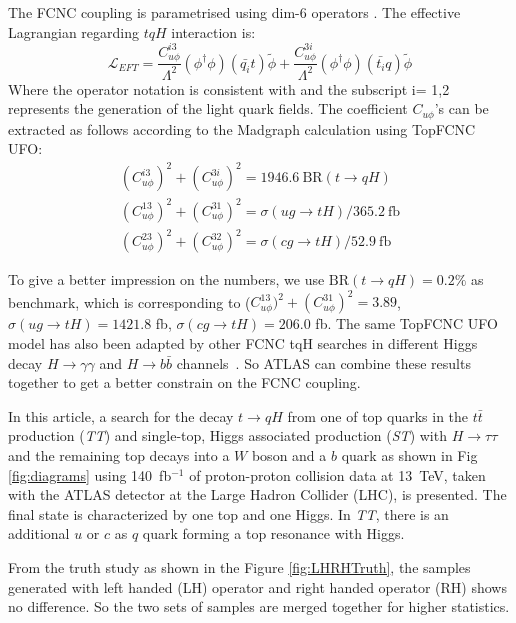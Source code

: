 The FCNC coupling is parametrised using dim-6 operators \cite{fcnc_production_theory}. The effective Lagrangian regarding $tqH$ interaction is:
%
\begin{equation}
\mathcal{L}_{EFT} = \frac{C^{i3}_{u\phi}}{\Lambda^{2}}(\phi^{\dagger}\phi)(\bar{q_{i}}t)\tilde{\phi} + \frac{C^{3i}_{u\phi}}{\Lambda^{2}}(\phi^{\dagger}\phi)(\bar{t_{i}}q)\tilde{\phi}
\label{eq:eq01}
\end{equation}
%
Where the operator notation is consistent with \cite{fcnc_production_theory} and the subscript i= 1,2 represents the generation of the light quark fields. 
The coefficient $C_{u\phi}$'s can be extracted as follows according to the Madgraph calculation using TopFCNC UFO:
\begin{equation}
\begin{array}{l}
(C^{i3}_{u\phi})^2 + (C^{3i}_{u\phi})^2 = 1946.6~\text{BR}(t\to qH)\\
(C^{13}_{u\phi})^2 + (C^{31}_{u\phi})^2 = \sigma(ug\to tH)/365.2~\text{fb}\\
(C^{23}_{u\phi})^2 + (C^{32}_{u\phi})^2 = \sigma(cg\to tH)/52.9~\text{fb}
\end{array}
\label{eq:eq02}
\end{equation}

To give a better impression on the numbers, we use $\text{BR}(t\to qH)=0.2\%$ as benchmark, which is corresponding to ($C^{13}_{u\phi})^2 + (C^{31}_{u\phi})^2=3.89$, $\sigma(ug\to tH)=1421.8$ fb, $\sigma(cg\to tH)=206.0$ fb. The same TopFCNC UFO model has also been adapted by other FCNC tqH searches in different Higgs decay $H\rightarrow\gamma\gamma$ and $H\rightarrow b\bar b$
channels~\cite{tqHgammagamma,tqHbb}. So ATLAS can combine these results together to get a better constrain on the FCNC coupling.  

In this article, a search for the decay $t\to qH$ from one of top quarks in the $t\bar{t}$ production (\textit{TT}) and single-top, Higgs associated production (\textit{ST}) with $H\to\tau\tau$ and the remaining top decays into a $W$ boson and a $b$ quark as shown in Fig \ref{fig:diagrams} using 140~fb$^{-1}$ of proton-proton collision data at 13~TeV, taken with the ATLAS detector at the Large Hadron Collider (LHC), is presented. The final state is characterized by one top and one Higgs. In \textit{TT}, there is an additional $u$ or $c$ as $q$ quark forming a top resonance with Higgs.



From the truth study as shown in the Figure \ref{fig:LHRHTruth}, the samples generated with left handed (LH) operator and right handed operator (RH) shows no difference. So the two sets of samples are merged together for higher statistics.

